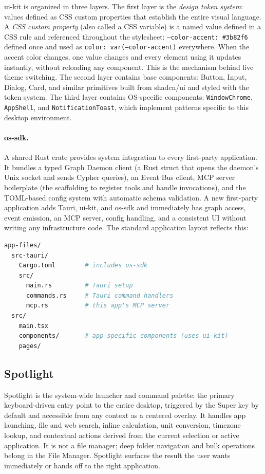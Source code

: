 ui-kit is organized in three layers. The first layer is the \emph{design token
system}: values defined as CSS custom properties that establish the entire
visual language. A \emph{CSS custom property} (also called a CSS variable) is
a named value defined in a CSS rule and referenced throughout the stylesheet:
\texttt{--color-accent: \#3b82f6} defined once and used as
\texttt{color: var(--color-accent)} everywhere. When the accent color changes,
one value changes and every element using it updates instantly, without
reloading any component. This is the mechanism behind live theme switching.
The second layer contains base components: Button, Input, Dialog, Card, and
similar primitives built from shadcn/ui and styled with the token system.
The third layer contains OS-specific components: \texttt{WindowChrome},
\texttt{AppShell}, and \texttt{NotificationToast}, which implement patterns
specific to this desktop environment.

\paragraph{os-sdk.}
A shared Rust crate provides system integration to every first-party
application. It bundles a typed Graph Daemon client (a Rust struct that opens
the daemon's Unix socket and sends Cypher queries), an Event Bus client, MCP
server boilerplate (the scaffolding to register tools and handle invocations),
and the TOML-based config system with automatic schema validation. A new
first-party application adds Tauri, ui-kit, and os-sdk and immediately has
graph access, event emission, an MCP server, config handling, and a consistent
UI without writing any infrastructure code. The standard application layout
reflects this:

\begin{lstlisting}[language=bash, caption={Standard first-party app structure}]
app-files/
  src-tauri/
    Cargo.toml        # includes os-sdk
    src/
      main.rs         # Tauri setup
      commands.rs     # Tauri command handlers
      mcp.rs          # this app's MCP server
  src/
    main.tsx
    components/       # app-specific components (uses ui-kit)
    pages/
\end{lstlisting}

\subsection{Spotlight}
\label{sec:spotlight}

Spotlight is the system-wide launcher and command palette: the primary
keyboard-driven entry point to the entire desktop, triggered by the Super key
by default and accessible from any context as a centered overlay. It handles
app launching, file and web search, inline calculation, unit conversion,
timezone lookup, and contextual actions derived from the current selection or
active application. It is not a file manager; deep folder navigation and bulk
operations belong in the File Manager. Spotlight surfaces the result the user
wants immediately or hands off to the right application.

